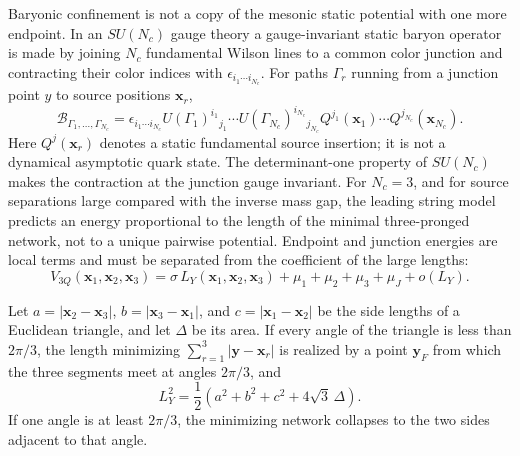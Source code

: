 Baryonic confinement is not a copy of the mesonic static potential with one
more endpoint.  In an \(SU(N_c)\) gauge theory a gauge-invariant static baryon
operator is made by joining \(N_c\) fundamental Wilson lines to a common color
junction and contracting their color indices with
\(\epsilon_{i_1\cdots i_{N_c}}\).  For paths
\(\Gamma_r\) running from a junction point \(y\) to source positions
\(\mathbf x_r\),
\[
  \mathcal B_{\Gamma_1,\ldots,\Gamma_{N_c}}
  =
  \epsilon_{i_1\cdots i_{N_c}}
  U(\Gamma_1)^{i_1}{}_{j_1}\cdots
  U(\Gamma_{N_c})^{i_{N_c}}{}_{j_{N_c}}
  Q^{j_1}(\mathbf x_1)\cdots Q^{j_{N_c}}(\mathbf x_{N_c}) .
\]
Here \(Q^j(\mathbf x_r)\) denotes a static fundamental source insertion; it
is not a dynamical asymptotic quark state.
The determinant-one property of \(SU(N_c)\) makes the contraction at the
junction gauge invariant.  For \(N_c=3\), and for source separations large
compared with the inverse mass gap, the leading string model predicts an
energy proportional to the length of the minimal three-pronged network, not
to a unique pairwise potential.  Endpoint and junction energies are local
terms and must be separated from the coefficient of the large lengths:
\begin{equation}
  V_{3Q}(\mathbf x_1,\mathbf x_2,\mathbf x_3)
  =
  \sigma\,L_Y(\mathbf x_1,\mathbf x_2,\mathbf x_3)
  +\mu_1+\mu_2+\mu_3+\mu_J+o(L_Y).
  \label{eq:qcd-string-baryon-y-potential}
\end{equation}

\begin{proposition}
\label{prop:qcd-string-steiner-y-length}
Let \(a=|\mathbf x_2-\mathbf x_3|\),
\(b=|\mathbf x_3-\mathbf x_1|\), and
\(c=|\mathbf x_1-\mathbf x_2|\) be the side lengths of a Euclidean triangle,
and let \(\Delta\) be its area.  If every angle of the triangle is less than
\(2\pi/3\), the length minimizing
\(\sum_{r=1}^3|\mathbf y-\mathbf x_r|\) is realized by a point
\(\mathbf y_F\) from which the three segments meet at angles \(2\pi/3\), and
\begin{equation}
  L_Y^2
  =
  \frac12
  \left(
    a^2+b^2+c^2+4\sqrt3\,\Delta
  \right).
  \label{eq:qcd-string-steiner-length-formula}
\end{equation}
If one angle is at least \(2\pi/3\), the minimizing network collapses to the
two sides adjacent to that angle.
\end{proposition}

